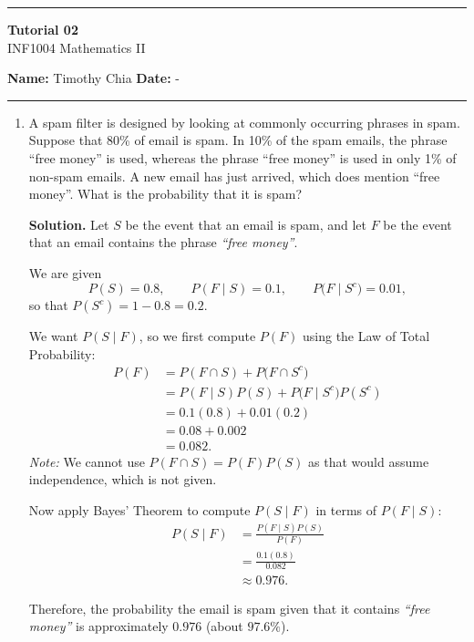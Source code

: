 \documentclass[12pt]{scrartcl}
\begin{document}
\begin{center}
	\hrule
	\vspace{0.4cm}
	{\textbf{\large Tutorial 02}}\\ [0.2cm]
    INF1004 Mathematics II
	
\end{center}

\textbf{Name:} Timothy Chia \hspace{\fill} \textbf{Date:} - \\

\hrule

\begin{enumerate}[label=\textbf{\arabic*.}]

\item A spam filter is designed by looking at commonly occurring phrases in spam. Suppose that 80\% of email is spam.
In 10\% of the spam emails, the phrase ``free money'' is used, whereas the phrase ``free money'' is used in only 1\%
of non-spam emails. A new email has just arrived, which does mention ``free money''. What is the probability that it is spam?

\medskip

\textbf{Solution.}
Let $S$ be the event that an email is spam, and let $F$ be the event that an email contains the phrase
\textit{``free money''}.

We are given
\[
P(S)=0.8,\qquad P(F\mid S)=0.1,\qquad P\big(F\mid S^{c}\big)=0.01,
\]
so that $P(S^{c})=1-0.8=0.2$.

We want $P(S\mid F)$, so we first compute $P(F)$ using the Law of Total Probability:
\begin{align*}
P(F)
&=P(F\cap S)+P\big(F\cap S^{c}\big)\\
&=P(F\mid S)P(S)+P\big(F\mid S^{c}\big)P(S^{c})\\
&=0.1(0.8)+0.01(0.2)\\
&=0.08+0.002\\
&=0.082.
\end{align*}
\emph{Note:} We cannot use $P(F\cap S)=P(F)P(S)$ as that would assume independence, which is not given.

Now apply Bayes' Theorem to compute $P(S\mid F)$ in terms of $P(F \mid S)$:
\begin{align*}
P(S\mid F)
&=\frac{P(F\mid S)P(S)}{P(F)}\\
&=\frac{0.1(0.8)}{0.082}\\
&\approx 0.976.
\end{align*}

Therefore, the probability the email is spam given that it contains \textit{``free money''} is approximately
$0.976$ (about $97.6\%$).



\end{enumerate}
\end{document}
